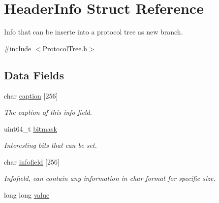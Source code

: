 \hypertarget{struct_header_info}{}\section{Header\+Info Struct Reference}
\label{struct_header_info}


Info that can be inserte into a protocol tree as new branch.  




{\ttfamily \#include $<$Protocol\+Tree.\+h$>$}

\subsection*{Data Fields}
\begin{DoxyCompactItemize}
\item 
\hypertarget{struct_header_info_a3edb66de361cd1c4685a77a4b5864b19}{}char \hyperlink{struct_header_info_a3edb66de361cd1c4685a77a4b5864b19}{caption} \mbox{[}256\mbox{]}\label{struct_header_info_a3edb66de361cd1c4685a77a4b5864b19}

\begin{DoxyCompactList}\small\item\em The caption of this info field. \end{DoxyCompactList}\item 
\hypertarget{struct_header_info_a427985c4a3b001b3c609e05807fec939}{}uint64\+\_\+t \hyperlink{struct_header_info_a427985c4a3b001b3c609e05807fec939}{bitmask}\label{struct_header_info_a427985c4a3b001b3c609e05807fec939}

\begin{DoxyCompactList}\small\item\em Interesting bits that can be set. \end{DoxyCompactList}\item 
\hypertarget{struct_header_info_a8a809f30e126c326199fac2aa5515853}{}char \hyperlink{struct_header_info_a8a809f30e126c326199fac2aa5515853}{infofield} \mbox{[}256\mbox{]}\label{struct_header_info_a8a809f30e126c326199fac2aa5515853}

\begin{DoxyCompactList}\small\item\em Infofield, can contain any information in char format for specific size. \end{DoxyCompactList}\item 
\hypertarget{struct_header_info_ae31cfcff621037c9cc0ed8180401aeb8}{}long long \hyperlink{struct_header_info_ae31cfcff621037c9cc0ed8180401aeb8}{value}\label{struct_header_info_ae31cfcff621037c9cc0ed8180401aeb8}


\end{DoxyCompactItemize}
